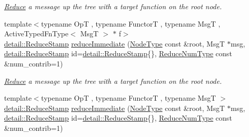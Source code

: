\begin{DoxyCompactItemize}
\begin{DoxyCompactList}\small\item\em \hyperlink{structvt_1_1collective_1_1reduce_1_1_reduce}{Reduce} a message up the tree with a target function on the root node. \end{DoxyCompactList}\item 
{\footnotesize template$<$typename OpT , typename FunctorT , typename MsgT , Active\+Typed\+Fn\+Type$<$ Msg\+T $>$ $\ast$ f$>$ }\\\hyperlink{namespacevt_1_1collective_1_1reduce_1_1detail_aacc1fcd729d934ba143fee3a943bf9e7}{detail\+::\+Reduce\+Stamp} \hyperlink{structvt_1_1collective_1_1reduce_1_1_reduce_a80589266a6fc802458c56cfe8f90679d}{reduce\+Immediate} (\hyperlink{namespacevt_a866da9d0efc19c0a1ce79e9e492f47e2}{Node\+Type} const \&root, MsgT $\ast$msg, \hyperlink{namespacevt_1_1collective_1_1reduce_1_1detail_aacc1fcd729d934ba143fee3a943bf9e7}{detail\+::\+Reduce\+Stamp} id=\hyperlink{namespacevt_1_1collective_1_1reduce_1_1detail_aacc1fcd729d934ba143fee3a943bf9e7}{detail\+::\+Reduce\+Stamp}\{\}, \hyperlink{structvt_1_1collective_1_1reduce_1_1_reduce_a6c3e63aca10c31d2823b0b18cf9762a4}{Reduce\+Num\+Type} const \&num\+\_\+contrib=1)
\begin{DoxyCompactList}\small\item\em \hyperlink{structvt_1_1collective_1_1reduce_1_1_reduce}{Reduce} a message up the tree with a target function on the root node. \end{DoxyCompactList}\item 
{\footnotesize template$<$typename OpT , typename FunctorT , typename MsgT $>$ }\\\hyperlink{namespacevt_1_1collective_1_1reduce_1_1detail_aacc1fcd729d934ba143fee3a943bf9e7}{detail\+::\+Reduce\+Stamp} \hyperlink{structvt_1_1collective_1_1reduce_1_1_reduce_abbd6473db94374257fa0bf66d994d549}{reduce\+Immediate} (\hyperlink{namespacevt_a866da9d0efc19c0a1ce79e9e492f47e2}{Node\+Type} const \&root, MsgT $\ast$msg, \hyperlink{namespacevt_1_1collective_1_1reduce_1_1detail_aacc1fcd729d934ba143fee3a943bf9e7}{detail\+::\+Reduce\+Stamp} id=\hyperlink{namespacevt_1_1collective_1_1reduce_1_1detail_aacc1fcd729d934ba143fee3a943bf9e7}{detail\+::\+Reduce\+Stamp}\{\}, \hyperlink{structvt_1_1collective_1_1reduce_1_1_reduce_a6c3e63aca10c31d2823b0b18cf9762a4}{Reduce\+Num\+Type} const \&num\+\_\+contrib=1)
\item 

\end{DoxyCompactItemize}
